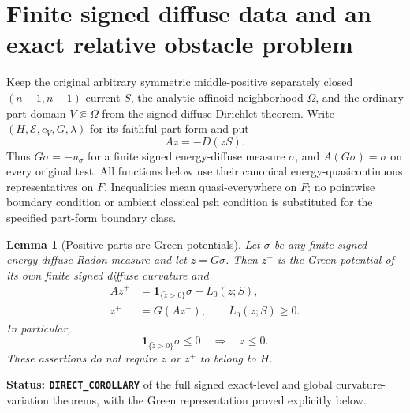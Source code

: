 \documentclass[11pt,a4paper]{article}
\numberwithin{equation}{section}
\newtheorem{lemma}[theorem]{Lemma}
\theoremstyle{definition}
\theoremstyle{remark}
\begin{document}


\section{Finite signed diffuse data and an exact relative obstacle problem}
\label{sec:r11-diffuse-obstacle-contact}

Keep the original arbitrary symmetric middle-positive separately
closed $(n-1,n-1)$-current $S$, the analytic affinoid neighborhood
$\Omega$, and the ordinary part domain $V\Subset\Omega$ from the
signed diffuse Dirichlet theorem.  Write $(H,\mathcal E,c_V,G,\lambda)$
for its faithful part form and put
\[
                              Az=-D(zS).
 \tag{OB1}
\]
Thus $G\sigma=-u_\sigma$ for a finite signed energy-diffuse measure
$\sigma$, and $A(G\sigma)=\sigma$ on every original test.
All functions below use their canonical energy-quasicontinuous
representatives on $F$.  Inequalities mean quasi-everywhere on $F$;
no pointwise boundary condition or ambient classical psh condition
is substituted for the specified part-form boundary class.

\begin{lemma}[Positive parts are Green potentials]
\label{lem:r11-diffuse-positive-part-Green}
Let $\sigma$ be any finite signed energy-diffuse Radon measure and
let $z=G\sigma$.  Then $z^+$ is the Green potential of its own finite
signed diffuse curvature and
\[
 \begin{split}
 Az^+&=\mathbf1_{\{\widetilde z>0\}}\sigma-L_0(z;S),\\
 z^+&=G(Az^+),\qquad L_0(z;S)\ge0.
 \end{split}
 \tag{OB2}
\]
In particular,
\[
        \mathbf1_{\{\widetilde z>0\}}\sigma\le0
                              \quad\Longrightarrow\quad z\le0.
 \tag{OB3}
\]
These assertions do not require $z$ or $z^+$ to belong to $H$.
\end{lemma}

\noindent\textbf{Status: \texttt{DIRECT\_COROLLARY}} of the full
signed exact-level and global curvature-variation theorems, with the
Green representation proved explicitly below.
\end{document}
